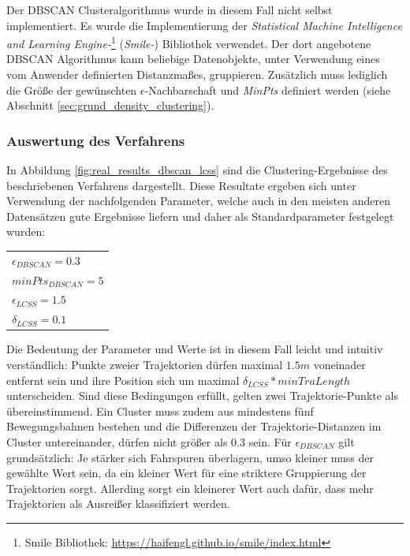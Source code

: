 Der DBSCAN Clusteralgorithmus wurde in diesem Fall nicht selbst implementiert. Es wurde die Implementierung
der \textit{Statistical Machine Intelligence and Learning Engine-}\footnote{Smile Bibliothek: \url{https://haifengl.github.io/smile/index.html}}
(\textit{Smile-}) Bibliothek verwendet. Der dort angebotene DBSCAN Algorithmus kann beliebige Datenobjekte, unter Verwendung eines
vom Anwender definierten Distanzmaßes, gruppieren. Zusätzlich muss lediglich die Größe der gewünschten
$\epsilon$-Nachbarschaft und \textit{MinPts} definiert werden (siehe Abschnitt \ref{sec:grund_density_clustering}).

\subsubsection{Auswertung des Verfahrens}
\label{sec:results_clustering_dbscan_lcss}

In Abbildung \ref{fig:real_results_dbscan_lcss} sind die Clustering-Ergebnisse des beschriebenen Verfahrens
dargestellt. Diese Resultate ergeben sich unter Verwendung der nachfolgenden Parameter, welche auch in den meisten anderen
Datensätzen gute Ergebnisse liefern und daher als Standardparameter festgelegt wurden:

{\renewcommand{\arraystretch}{1.2}
\begin{center}
    \begin{tabular}{l}
        $\epsilon_{DBSCAN} = 0.3$ \\
        $minPts_{DBSCAN} = 5$ \\
        $\epsilon_{LCSS} = 1.5$ \\
        $\delta_{LCSS} = 0.1$ \\
    \end{tabular}
\end{center}
}

Die Bedeutung der Parameter und Werte ist in diesem Fall leicht und intuitiv verständlich: Punkte zweier Trajektorien
dürfen maximal $1.5m$ voneinader entfernt sein und ihre Position sich um maximal $\delta_{LCSS} * minTraLength$ unterscheiden.
Sind diese Bedingungen erfüllt, gelten zwei Trajektorie-Punkte als übereinstimmend. Ein Cluster muss zudem aus mindestens
fünf Bewegungsbahnen bestehen und die Differenzen der Trajektorie-Distanzen im Cluster untereinander, dürfen nicht größer als 0.3 sein.
Für $\epsilon_{DBSCAN}$ gilt grundsätzlich: Je stärker sich Fahrspuren überlagern, umso kleiner muss der gewählte Wert sein, da
ein kleiner Wert für eine striktere Gruppierung der Trajektorien sorgt. Allerding sorgt ein kleinerer Wert
auch dafür, dass mehr Trajektorien als Ausreißer klassifiziert werden.


